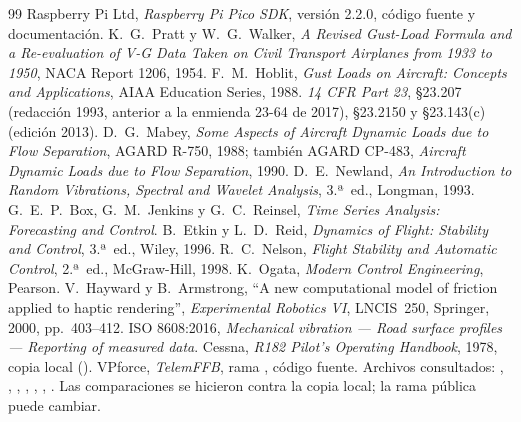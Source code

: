 \clearpage
{}
{}
\renewcommand{\refname}{Bibliografía}
\begin{thebibliography}{99}
 Raspberry Pi Ltd, \emph{Raspberry Pi Pico SDK}, versión 2.2.0, código fuente y documentación.
 K.~G.~Pratt y W.~G.~Walker, \emph{A Revised Gust-Load Formula and a Re-evaluation of V-G Data Taken on Civil Transport Airplanes from 1933 to 1950}, NACA Report 1206, 1954.
 F.~M.~Hoblit, \emph{Gust Loads on Aircraft: Concepts and Applications}, AIAA Education Series, 1988.
 \emph{14 CFR Part 23}, §23.207 (redacción 1993, anterior a la enmienda 23-64 de 2017), §23.2150 y §23.143(c) (edición 2013).
 D.~G.~Mabey, \emph{Some Aspects of Aircraft Dynamic Loads due to Flow Separation}, AGARD R-750, 1988; también AGARD CP-483, \emph{Aircraft Dynamic Loads due to Flow Separation}, 1990.
 D.~E.~Newland, \emph{An Introduction to Random Vibrations, Spectral and Wavelet Analysis}, 3.ª~ed., Longman, 1993.
 G.~E.~P.~Box, G.~M.~Jenkins y G.~C.~Reinsel, \emph{Time Series Analysis: Forecasting and Control}.
 B.~Etkin y L.~D.~Reid, \emph{Dynamics of Flight: Stability and Control}, 3.ª~ed., Wiley, 1996.
 R.~C.~Nelson, \emph{Flight Stability and Automatic Control}, 2.ª~ed., McGraw-Hill, 1998.
 K.~Ogata, \emph{Modern Control Engineering}, Pearson.
 V.~Hayward y B.~Armstrong, ``A new computational model of friction applied to haptic rendering'', \emph{Experimental Robotics VI}, LNCIS~250, Springer, 2000, pp.~403--412.
 ISO 8608:2016, \emph{Mechanical vibration --- Road surface profiles --- Reporting of measured data}.
 Cessna, \emph{R182 Pilot's Operating Handbook}, 1978, copia local ().
 VPforce, \emph{TelemFFB}, rama , código fuente. Archivos consultados: \href{https://github.com/walmis/VPforce-TelemFFB/blob/refactor/telemffb/sim/msfs_xp/MsfsXpFlightControlsMixIn.py}{}, \href{https://github.com/walmis/VPforce-TelemFFB/blob/refactor/telemffb/utils/TurbulenceModulator.py}{}, \href{https://github.com/walmis/VPforce-TelemFFB/blob/refactor/telemffb/sim/msfs_xp/TurbulenceMixIn.py}{}, \href{https://github.com/walmis/VPforce-TelemFFB/blob/refactor/telemffb/telem/SimConnectManager.py}{}, \href{https://github.com/walmis/VPforce-TelemFFB/blob/refactor/telemffb/sim/base/MotionEffectsMixIn.py}{}, \href{https://github.com/walmis/VPforce-TelemFFB/blob/refactor/telemffb/sim/base/BuffetingEffectMixIn.py}{}, \href{https://github.com/walmis/VPforce-TelemFFB/blob/refactor/telemffb/sim/base/FFBForcesMixIn.py}{}. Las comparaciones se hicieron contra la copia local; la rama pública puede cambiar.

\end{thebibliography}

